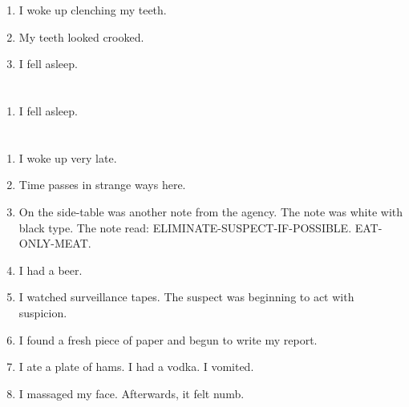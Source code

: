 \documentclass{article}
\begin{document}
    \begin{enumerate}
    
    \item I woke up clenching my teeth.\\
    
    \item My teeth looked crooked.\\
    
    \item I fell asleep.\\
    
    \end{enumerate}
     
    \newpage
    
    \section{}
    
    \begin{enumerate}
    
    \item I fell asleep.\\
    
    \end{enumerate}
     
    \newpage
    
    \section{}
    
    \begin{enumerate}
    
    \item I woke up very late.\\
    
    \item Time passes in strange ways here.\\
    
    \item On the side-table was another note from the agency. The note was white with black type. The note read: ELIMINATE-SUSPECT-IF-POSSIBLE. EAT-ONLY-MEAT.\\
    
    \item I had a beer.\\
    
    \item I watched surveillance tapes. The suspect was beginning to act with suspicion.\\
    
    \item I found a fresh piece of paper and begun to write my report.\\
    
    \item I ate a plate of hams. I had a vodka. I vomited.\\
    
    \item I massaged my face. Afterwards, it felt numb.\\
    
    \end{enumerate}
     
\end{document}
